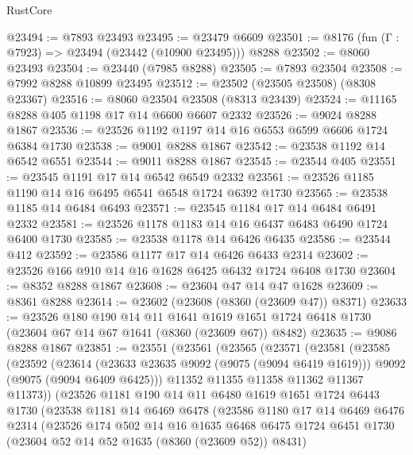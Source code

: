 \begin{lexlean}{RustCore}
\begin{coremodule}
@23494 := @7893 @23493
@23495 := @23479 @6609
@23501 := @8176 (fun (Γ : @7923) => @23494 (@23442 (@10900 @23495))) @8288
@23502 := @8060 @23493
@23504 := @23440 (@7985 @8288)
@23505 := @7893 @23504
@23508 := @7992 @8288 @10899 @23495
@23512 := @23502 (@23505 @23508) (@8308 @23367)
@23516 := @8060 @23504 @23508 (@8313 @23439)
@23524 := @11165 @8288 @405 @1198 @17 @14 @6600 @6607 @2332
@23526 := @9024 @8288 @1867
@23536 := @23526 @1192 @1197 @14 @16 @6553 @6599 @6606 @1724 @6384 @1730
@23538 := @9001 @8288 @1867
@23542 := @23538 @1192 @14 @6542 @6551
@23544 := @9011 @8288 @1867
@23545 := @23544 @405
@23551 := @23545 @1191 @17 @14 @6542 @6549 @2332
@23561 := @23526 @1185 @1190 @14 @16 @6495 @6541 @6548 @1724 @6392 @1730
@23565 := @23538 @1185 @14 @6484 @6493
@23571 := @23545 @1184 @17 @14 @6484 @6491 @2332
@23581 := @23526 @1178 @1183 @14 @16 @6437 @6483 @6490 @1724 @6400 @1730
@23585 := @23538 @1178 @14 @6426 @6435
@23586 := @23544 @412
@23592 := @23586 @1177 @17 @14 @6426 @6433 @2314
@23602 := @23526 @166 @910 @14 @16 @1628 @6425 @6432 @1724 @6408 @1730
@23604 := @8352 @8288 @1867
@23608 := @23604 @47 @14 @47 @1628
@23609 := @8361 @8288
@23614 := @23602 (@23608 (@8360 (@23609 @47)) @8371)
@23633 := @23526
    @180
    @190
    @14
    @11
    @1641
    @1619
    @1651
    @1724
    @6418
    @1730
    (@23604 @67 @14 @67 @1641 (@8360 (@23609 @67)) @8482)
@23635 := @9086 @8288 @1867
@23851 := @23551
    (@23561
      (@23565
        (@23571
          (@23581
            (@23585
              (@23592
                (@23614
                  (@23633 @23635 @9092 (@9075 (@9094 @6419 @1619)))
                  @9092
                  (@9075 (@9094 @6409 @6425)))
                @11352
                @11355
                @11358
                @11362
                @11367
                @11373))
            (@23526
              @1181
              @190
              @14
              @11
              @6480
              @1619
              @1651
              @1724
              @6443
              @1730
              (@23538
                @1181
                @14
                @6469
                @6478
                (@23586
                  @1180
                  @17
                  @14
                  @6469
                  @6476
                  @2314
                  (@23526
                    @174
                    @502
                    @14
                    @16
                    @1635
                    @6468
                    @6475
                    @1724
                    @6451
                    @1730
                    (@23604 @52 @14 @52 @1635 (@8360 (@23609 @52)) @8431)

\end{coremodule}
\end{lexlean}

